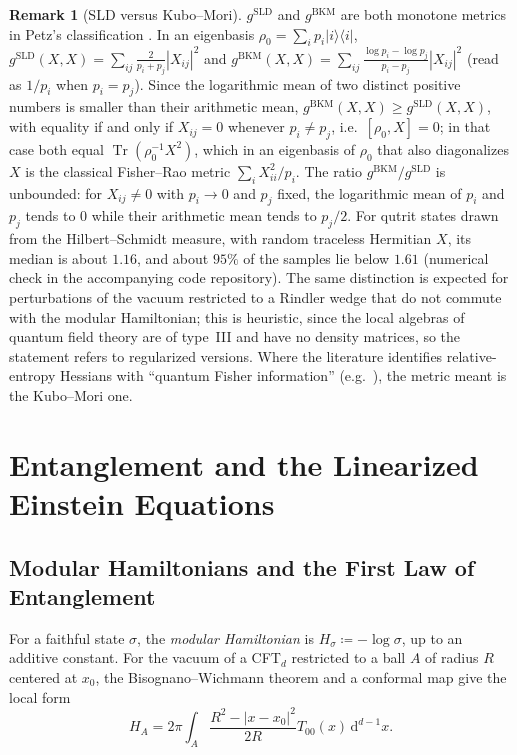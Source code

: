 \documentclass[11pt,a4paper,reqno]{amsart}
\theoremstyle{definition}
\newtheorem{remark}[theorem]{Remark}
\numberwithin{equation}{section}
\newcommand{\dif}{\,\mathrm{d}}
\begin{document}
\begin{remark}[SLD versus Kubo--Mori]
\label{rem:sld_vs_bkm}
$g^{\mathrm{SLD}}$ and $g^{\mathrm{BKM}}$ are both monotone metrics in Petz's classification \cite{petz1996}. In an eigenbasis $\rho_0 = \sum_i p_i |i\rangle\langle i|$, $g^{\mathrm{SLD}}(X,X) = \sum_{ij} \frac{2}{p_i + p_j}|X_{ij}|^2$ and $g^{\mathrm{BKM}}(X,X) = \sum_{ij} \frac{\log p_i - \log p_j}{p_i - p_j}|X_{ij}|^2$ (read as $1/p_i$ when $p_i = p_j$). Since the logarithmic mean of two distinct positive numbers is smaller than their arithmetic mean, $g^{\mathrm{BKM}}(X,X) \ge g^{\mathrm{SLD}}(X,X)$, with equality if and only if $X_{ij} = 0$ whenever $p_i \ne p_j$, i.e.\ $[\rho_0, X] = 0$; in that case both equal $\operatorname{Tr}(\rho_0^{-1}X^2)$, which in an eigenbasis of $\rho_0$ that also diagonalizes $X$ is the classical Fisher--Rao metric $\sum_i X_{ii}^2/p_i$. The ratio $g^{\mathrm{BKM}}/g^{\mathrm{SLD}}$ is unbounded: for $X_{ij} \ne 0$ with $p_i \to 0$ and $p_j$ fixed, the logarithmic mean of $p_i$ and $p_j$ tends to $0$ while their arithmetic mean tends to $p_j/2$. For qutrit states drawn from the Hilbert--Schmidt measure, with random traceless Hermitian $X$, its median is about $1.16$, and about $95\%$ of the samples lie below $1.61$ (numerical check in the accompanying code repository). The same distinction is expected for perturbations of the vacuum restricted to a Rindler wedge that do not commute with the modular Hamiltonian; this is heuristic, since the local algebras of quantum field theory are of type~III and have no density matrices, so the statement refers to regularized versions. Where the literature identifies relative-entropy Hessians with ``quantum Fisher information'' (e.g.\ \cite{lashkari2016canonical}), the metric meant is the Kubo--Mori one.
\end{remark}

\section{Entanglement and the Linearized Einstein Equations}
\label{sec:einstein_derivation}

\subsection{Modular Hamiltonians and the First Law of Entanglement}
For a faithful state $\sigma$, the \emph{modular Hamiltonian} is $H_\sigma \coloneqq -\log \sigma$, up to an additive constant. For the vacuum of a CFT$_d$ restricted to a ball $A$ of radius $R$ centered at $x_0$, the Bisognano--Wichmann theorem \cite{bisognano1976} and a conformal map \cite{casini2011} give the local form
\begin{equation}
    \label{eq:local_modular_ham}
    H_A = 2\pi \int_A \frac{R^2 - |x - x_0|^2}{2 R} T_{00}(x) \dif^{d-1} x.
\end{equation}
\end{document}
